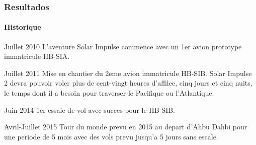 \documentclass{beamer}
\begin{document}
\begin{frame}
\frametitle{Resultados}
\framesubtitle{Historique}
\begin{block}{Juillet 2010}
L'aventure Solar Impulse commence avec un 1er avion prototype immatricule HB-SIA. 
\end{block}

\begin{block}{Juillet 2011}
Mise en chantier du 2eme avion immatricule HB-SIB. Solar Impulse 2 devra pouvoir voler plus de cent-vingt heures d'affilee, cinq jours et cinq nuits, le temps dont il a besoin pour traverser le Pacifique ou l'Atlantique.
\end{block}

\begin{block}{Juin 2014}
1er essaie de vol avec succes pour le HB-SIB.
\end{block}


\begin{block}{Avril-Juillet 2015}
Tour du monde prevu en 2015 au depart d'Ahbu Dahbi pour une periode de 5 mois avec des vols prevu jusqu'a 5 jours sans escale. 
\end{block}

\end{frame}


\end{document}
